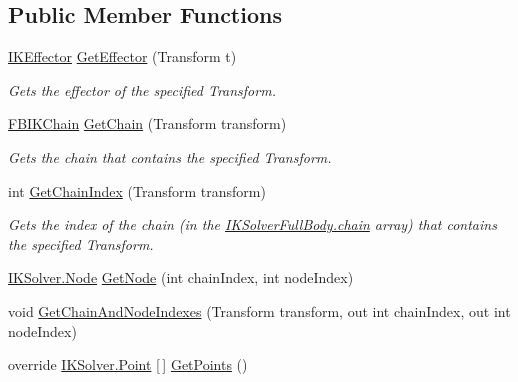 \subsection*{Public Member Functions}
\begin{DoxyCompactItemize}
\item 
\mbox{\hyperlink{class_root_motion_1_1_final_i_k_1_1_i_k_effector}{I\+K\+Effector}} \mbox{\hyperlink{class_root_motion_1_1_final_i_k_1_1_i_k_solver_full_body_a01f3b5d21d61ed9ef995a699801df3ca}{Get\+Effector}} (Transform t)
\begin{DoxyCompactList}\small\item\em Gets the effector of the specified Transform. \end{DoxyCompactList}\item 
\mbox{\hyperlink{class_root_motion_1_1_final_i_k_1_1_f_b_i_k_chain}{F\+B\+I\+K\+Chain}} \mbox{\hyperlink{class_root_motion_1_1_final_i_k_1_1_i_k_solver_full_body_a2f623d9c15b58d7b0e614ce219fe54b7}{Get\+Chain}} (Transform transform)
\begin{DoxyCompactList}\small\item\em Gets the chain that contains the specified Transform. \end{DoxyCompactList}\item 
int \mbox{\hyperlink{class_root_motion_1_1_final_i_k_1_1_i_k_solver_full_body_afa18af05d42150df4de773d6cd85b027}{Get\+Chain\+Index}} (Transform transform)
\begin{DoxyCompactList}\small\item\em Gets the index of the chain (in the \mbox{\hyperlink{class_root_motion_1_1_final_i_k_1_1_i_k_solver_full_body_aae6ec635c069329275bd5e3eb18dac41}{I\+K\+Solver\+Full\+Body.\+chain}} array) that contains the specified Transform. \end{DoxyCompactList}\item 
\mbox{\hyperlink{class_root_motion_1_1_final_i_k_1_1_i_k_solver_1_1_node}{I\+K\+Solver.\+Node}} \mbox{\hyperlink{class_root_motion_1_1_final_i_k_1_1_i_k_solver_full_body_a79ac1fc3ed2d9cba9a13f7448abfb00f}{Get\+Node}} (int chain\+Index, int node\+Index)
\item 
void \mbox{\hyperlink{class_root_motion_1_1_final_i_k_1_1_i_k_solver_full_body_a5592a6494b14a6d4f6da45867ab0a9dc}{Get\+Chain\+And\+Node\+Indexes}} (Transform transform, out int chain\+Index, out int node\+Index)
\item 
override \mbox{\hyperlink{class_root_motion_1_1_final_i_k_1_1_i_k_solver_1_1_point}{I\+K\+Solver.\+Point}} \mbox{[}$\,$\mbox{]} \mbox{\hyperlink{class_root_motion_1_1_final_i_k_1_1_i_k_solver_full_body_a3f5d0189403f02d2b30c6174c2a00fbb}{Get\+Points}} ()

\end{DoxyCompactItemize}
